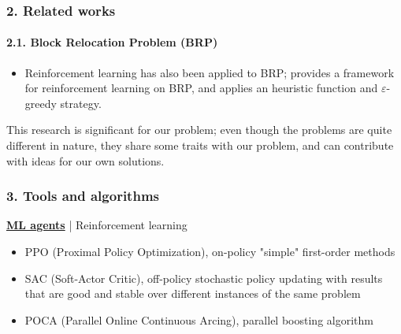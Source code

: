 \documentclass{beamer}
\begin{document}
\begin{frame}

\frametitle{2. Related works}
\framesubtitle{2.1. Block Relocation Problem (BRP)}
\begin{itemize}
  \item Reinforcement learning has also been applied to BRP; \cite{jiang2021} provides a framework for reinforcement learning on BRP, and applies an heuristic function and $\varepsilon$-greedy strategy.
\end{itemize}

This research is significant for our problem; even though the problems are quite different in nature, they share some traits with our problem, and can contribute with ideas for our own solutions.

\end{frame}

\begin{frame}
  \frametitle{3. Tools and algorithms}

  \href{https://github.com/Unity-Technologies/ml-agents}{\textbf{ML agents}} | Reinforcement learning
  \begin{itemize}
    \item PPO (Proximal Policy Optimization), on-policy "simple" first-order methods \cite{openai-ppo, schulman2017}
    \item SAC (Soft-Actor Critic), off-policy stochastic policy updating with results that are good and stable over different instances of the same problem \cite{openai-sac, haarnoja2018}
    \item POCA (Parallel Online Continuous Arcing), parallel boosting algorithm \cite{reichler2004}
  \end{itemize}
\end{frame}
\end{document}
